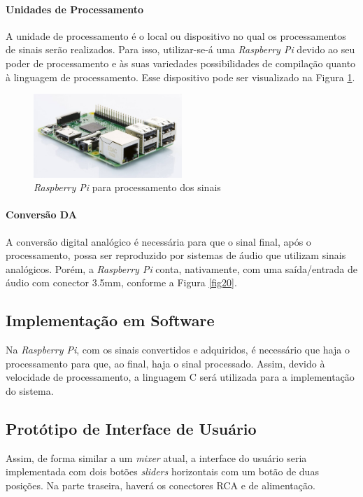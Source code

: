     \paragraph{Unidades de Processamento}

    A unidade de processamento é o local ou dispositivo no qual os processamentos de sinais serão realizados. Para isso, utilizar-se-á uma \textit{Raspberry Pi} devido ao seu poder de processamento e às suas variedades possibilidades de compilação quanto à linguagem de processamento. Esse dispositivo pode ser visualizado na Figura \ref{fig65}.

    \begin{figure}[h]
        \centering
        \includegraphics[width=0.5\textwidth]{figuras/fig65.jpg}
        \caption{\textit{Raspberry Pi} para processamento dos sinais}
        \label{fig65}
    \end{figure}    


    \paragraph{Conversão DA}

    A conversão digital analógico é necessária para que o sinal final, após o processamento, possa ser reproduzido por sistemas de áudio que utilizam sinais analógicos. Porém, a \textit{Raspberry Pi} conta, nativamente, com uma saída/entrada de áudio com conector 3.5mm, conforme a Figura \ref{fig20}.
    
    
    \subsection{Implementação em Software}

    Na \textit{Raspberry Pi}, com os sinais convertidos e adquiridos, é necessário que haja o processamento para que, ao final, haja o sinal processado. Assim, devido à velocidade de processamento, a linguagem C será utilizada para a implementação do sistema. 
        
    \subsection{Protótipo de Interface de Usuário}

        Assim, de forma similar a um \textit{mixer} atual, a interface do usuário seria implementada com dois botões \textit{sliders} horizontais com um botão de duas posições. Na parte traseira, haverá os conectores RCA e de alimentação.